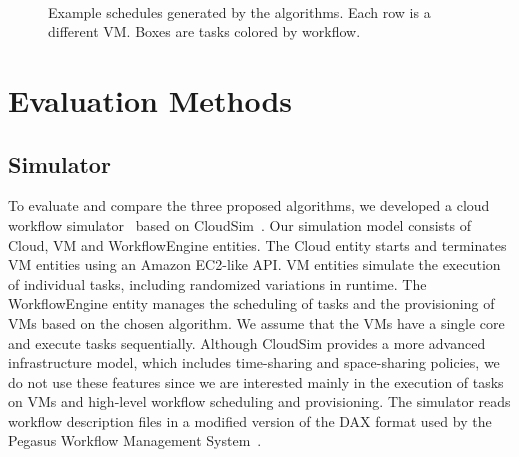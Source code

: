 \documentclass[preprint,5p]{elsarticle}
\begin{document}
\begin{figure}[tb] 
  \centering
  \\
  \caption[Example schedules generated by the algorithms]{Example
  schedules generated by the algorithms. Each row is a different
  VM. Boxes are tasks colored by workflow.}
  \label{fig:examples-simulated}

\end{figure}




\section{Evaluation Methods}
\label{sec:performance}


\subsection{Simulator}

To evaluate and compare the three proposed algorithms, we developed a cloud
workflow simulator~\cite{CloudWorkflowSimulator} based on CloudSim~\cite{Calheiros2011}. Our
simulation model consists of Cloud, VM and WorkflowEngine entities. The Cloud entity starts and
terminates VM entities using an Amazon EC2-like API. VM entities simulate the
execution of individual tasks, including randomized variations in runtime. The
WorkflowEngine entity manages the scheduling of tasks and the provisioning of 
VMs based on the chosen algorithm. We assume that the VMs have a single core
and execute tasks sequentially. 
Although CloudSim provides a more advanced infrastructure model, which includes
time-sharing and space-sharing policies, we do not use these features since we
are interested mainly in the execution of tasks on VMs and high-level workflow
scheduling and provisioning. 
The simulator reads workflow description files in
a modified version of the DAX format used by the Pegasus Workflow Management
System~\cite{Deelman2005}. 
\end{document}
